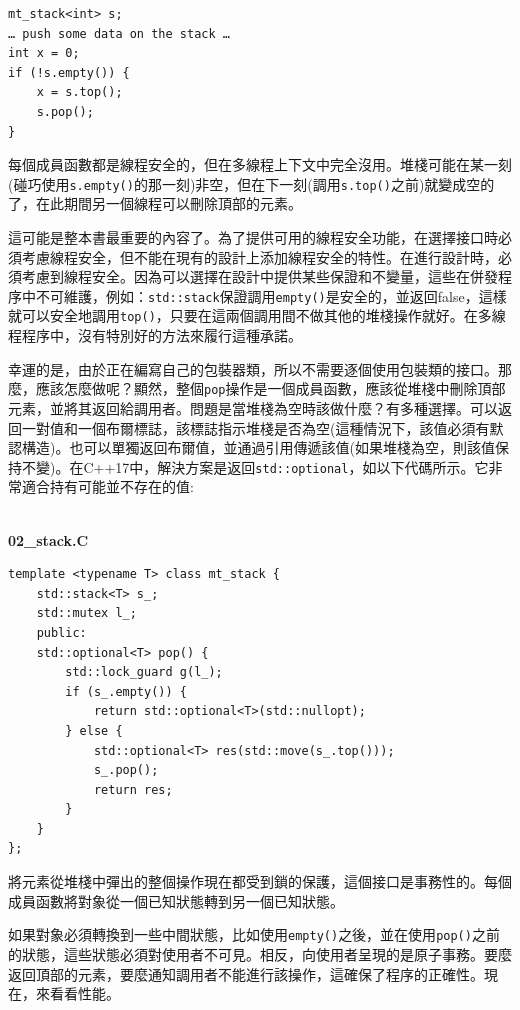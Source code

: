 \begin{lstlisting}[style=styleCXX]
mt_stack<int> s;
… push some data on the stack …
int x = 0;
if (!s.empty()) {
	x = s.top();
	s.pop();
}
\end{lstlisting}

每個成員函數都是線程安全的，但在多線程上下文中完全沒用。堆棧可能在某一刻(碰巧使用\texttt{s.empty()}的那一刻)非空，但在下一刻(調用\texttt{s.top()}之前)就變成空的了，在此期間另一個線程可以刪除頂部的元素。

這可能是整本書最重要的內容了。為了提供可用的線程安全功能，在選擇接口時必須考慮線程安全，但不能在現有的設計上添加線程安全的特性。在進行設計時，必須考慮到線程安全。因為可以選擇在設計中提供某些保證和不變量，這些在併發程序中不可維護，例如：\texttt{std::stack}保證調用\texttt{empty()}是安全的，並返回false，這樣就可以安全地調用\texttt{top()}，只要在這兩個調用間不做其他的堆棧操作就好。在多線程程序中，沒有特別好的方法來履行這種承諾。

幸運的是，由於正在編寫自己的包裝器類，所以不需要逐個使用包裝類的接口。那麼，應該怎麼做呢？顯然，整個\texttt{pop}操作是一個成員函數，應該從堆棧中刪除頂部元素，並將其返回給調用者。問題是當堆棧為空時該做什麼？有多種選擇。可以返回一對值和一個布爾標誌，該標誌指示堆棧是否為空(這種情況下，該值必須有默認構造)。也可以單獨返回布爾值，並通過引用傳遞該值(如果堆棧為空，則該值保持不變)。在C++17中，解決方案是返回\texttt{std::optional}，如以下代碼所示。它非常適合持有可能並不存在的值:

\hspace*{\fill} \\ %
\noindent
\textbf{02\_stack.C}
\begin{lstlisting}[style=styleCXX]
template <typename T> class mt_stack {
	std::stack<T> s_;
	std::mutex l_;
	public:
	std::optional<T> pop() {
		std::lock_guard g(l_);
		if (s_.empty()) {
			return std::optional<T>(std::nullopt);
		} else {
			std::optional<T> res(std::move(s_.top()));
			s_.pop();
			return res;
		}
	}
};
\end{lstlisting}

將元素從堆棧中彈出的整個操作現在都受到鎖的保護，這個接口是事務性的。每個成員函數將對象從一個已知狀態轉到另一個已知狀態。

如果對象必須轉換到一些中間狀態，比如使用\texttt{empty()}之後，並在使用\texttt{pop()}之前的狀態，這些狀態必須對使用者不可見。相反，向使用者呈現的是原子事務。要麼返回頂部的元素，要麼通知調用者不能進行該操作，這確保了程序的正確性。現在，來看看性能。


